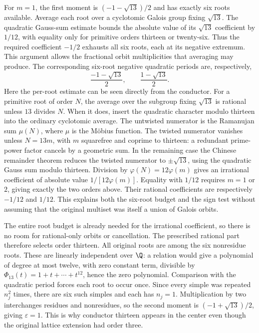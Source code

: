 For $m=1$, the first moment is $(-1-\sqrt{13})/2$ and has exactly
six roots available. Average each root over a cyclotomic Galois
group fixing $\sqrt{13}$. The quadratic Gauss-sum estimate bounds
the absolute value of its $\sqrt{13}$ coefficient by $1/12$,
with equality only for primitive orders thirteen or twenty-six.
Thus the required coefficient $-1/2$ exhausts all six roots, each
at its negative extremum. This argument allows the fractional
orbit multiplicities that averaging may produce. The corresponding
six-root negative quadratic periods are, respectively,
\[
 \frac{-1-\sqrt{13}}2,\qquad
\frac{1-\sqrt{13}}2.
\]
Here the per-root estimate can be seen directly from the conductor.
For a primitive root of order $N$, the average over the subgroup
fixing $\sqrt{13}$ is rational unless $13$ divides $N$.
When it does, insert the quadratic character modulo thirteen
into the ordinary cyclotomic average. The untwisted numerator
is the Ramanujan sum $\mu(N)$, where $\mu$ is the M\"obius
function. The twisted numerator vanishes unless
$N=13m$, with $m$ squarefree and coprime to thirteen: a
redundant prime-power factor cancels by a geometric sum.
In the remaining case the Chinese remainder theorem reduces
the twisted numerator to $\pm\sqrt{13}$, using the quadratic
Gauss sum modulo thirteen. Division by
$\varphi(N)=12\varphi(m)$ gives an irrational coefficient of
absolute value $1/[12\varphi(m)]$. Equality with $1/12$
requires $m=1$ or $2$, giving exactly the two orders above.
Their rational coefficients are respectively $-1/12$ and
$1/12$. This explains both the six-root budget and the sign
test without assuming that the original multiset was itself
a union of Galois orbits.

The entire root budget is already needed for the irrational
coefficient, so there is no room for rational-only orbits or
cancellation. The prescribed rational part therefore selects order
thirteen. All original roots are among the six nonresidue roots.
These are linearly independent over $\Q$: a relation would give
a polynomial of degree at most twelve, with zero constant term,
divisible by $\Phi_{13}(t)=1+t+\cdots+t^{12}$, hence the zero
polynomial. Comparison with the quadratic period forces each root
to occur once. Since every simple was repeated $n_j^2$ times,
there are six such simples and each has $n_j=1$.
Multiplication by two
interchanges residues and nonresidues, so the second moment is
$(-1+\sqrt{13})/2$, giving $\varepsilon=1$.
This is why conductor thirteen appears in the center even though the
original lattice extension had order three.

